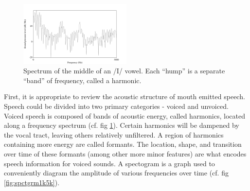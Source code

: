 \documentclass[dissertation,copyright]{uathesis}
\begin{document}
\begin{figure}
\centering
  \includegraphics[width=0.5\textwidth]{figure/spctrm5k.png}
  \caption{Spectrum of the middle of an /I/ vowel.  Each ``hump'' is a separate ``band'' of frequency, called a harmonic.}
  \label{fig:spctrm5k}
\end{figure}
%
First, it is appropriate to review the acoustic structure of mouth emitted speech.  Speech could be divided into two primary categories - voiced and unvoiced.  Voiced speech is composed of bands of acoustic energy, called harmonics, located along a frequency spectrum (cf. fig \ref{fig:spctrm5k}).  
%
Certain harmonics will be dampened by the vocal tract, leaving others relatively unfiltered.  A region of harmonics containing more energy are called formants.  The location, shape, and transition over time of these formants (among other more minor features) are what encodes speech information for voiced sounds.  A spectogram is a graph used to conveniently diagram the amplitude of various frequencies over time (cf. fig \ref{fig:spctgrm1k5k}).
%
\end{document}
